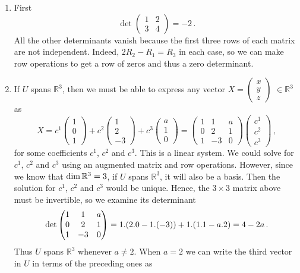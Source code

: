 \begin{enumerate}
\item First 
\[\det\begin{pmatrix}1&2\\3&4\end{pmatrix}=-2\, .\]
All the other determinants vanish because the first three rows of each matrix are not independent. 
Indeed, $2R_2-R_1=R_3$ in each case, so we can make row operations to get a row of zeros and thus a zero determinant. 

\item If $U$ spans ${\mathbb R}^3$, then we must be able to express any vector $X=\begin{pmatrix}x\\y\\z\end{pmatrix}$ $\in {\mathbb R}^3$
as
\[
X=c^1\begin{pmatrix}1\\0\\1\end{pmatrix}+c^2\begin{pmatrix}1\\2\\-3\end{pmatrix}+c^3\begin{pmatrix}a\\1\\0\end{pmatrix}
=\begin{pmatrix}1&1&a\\0&2&1\\1&-3&0\end{pmatrix}\begin{pmatrix}c^1\\c^2\\c^3\end{pmatrix}\, ,
\]
for some coefficients $c^1$, $c^2$ and $c^3$. This is a linear system. We could solve for $c^1$, $c^2$ and $c^3$ using an
augmented matrix and row operations. However, since we know that ${\rm dim}\, {\mathbb R}^3=3$, if $U$ spans ${\mathbb R}^3$,
it will also be a basis. Then the solution for  $c^1$, $c^2$ and $c^3$ would be unique. Hence, the $3\times 3$ matrix above must 
be invertible, so we examine its determinant
\[
{\rm det} \begin{pmatrix}1&1&a\\0&2&1\\1&-3&0\end{pmatrix}
=1.(2.0-1.(-3))+1.(1.1-a.2)=4-2a\, .
\]
Thus $U$ spans ${\mathbb R}^3$ whenever $a\neq 2$. When $a=2$ we can write the third vector in $U$ in terms of the preceding ones as

\end{enumerate}
